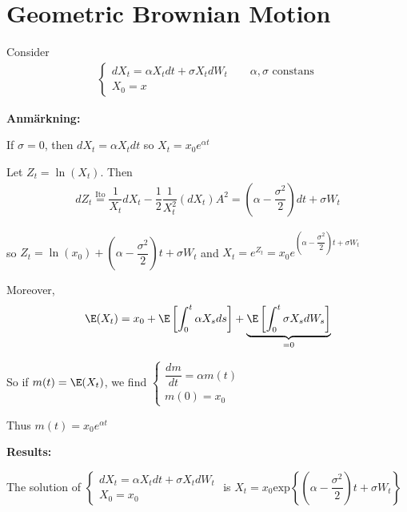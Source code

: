 \section{Geometric Brownian Motion}
Consider
\begin{equation*}
  \begin{gathered}
    \begin{cases}
      dX_t = \alpha X_tdt + \sigma X_tdW_t\qquad\text{$\alpha, \sigma$ constans}\\
      X_0 = x
    \end{cases}
  \end{gathered}
\end{equation*}\par
\noindent\textbf{Anmärkning:}\par
\noindent If $\sigma = 0$, then $dX_t = \alpha X_tdt$ so $X_t = x_0e^{\alpha t}$\par
\noindent Let $Z_t = \ln{\left(X_t\right)}$. Then
\begin{equation*}
  \begin{gathered}
    dZ_t \stackrel{\text{Ito}}{=}\dfrac{1}{X_t}dX_t - \dfrac{1}{2}\dfrac{1}{X_t^2}\left(dX_t\right)A^2 = \left(\alpha-\dfrac{\sigma^2}{2}\right)dt+\sigma W_t
  \end{gathered}
\end{equation*}\par
\noindent so $Z_t = \ln{\left(x_0\right)}+\left(\alpha-\dfrac{\sigma^2}{2}\right)t+\sigma W_t$ and $X_t = e^{Z_t}=x_0e^{\left(\alpha-\dfrac{\sigma^2}{2}\right)t+\sigma W_t}$
\par\bigskip
\noindent Moreover,
\begin{equation*}
  \begin{gathered}
    \E(X_t) = x_0+\E\left[\int_{0}^{t}\alpha X_sds\right] + \underbrace{\E\left[\int_{0}^{t}\sigma X_sdW_s\right]}_{=0}
  \end{gathered}
\end{equation*}\par
\noindent So if $m(t) = \E(X_t)$, we find $\begin{cases}
  \dfrac{dm}{dt} = \alpha m(t)\\ m(0)=x_0
\end{cases}$\par
\noindent Thus $m(t) = x_0e^{\alpha t}$
\par\bigskip
\noindent\textbf{Results:}\par
\noindent The solution of $\begin{cases}
  dX_t = \alpha X_tdt + \sigma X_tdW_t\\X_0=x_0
\end{cases}$ is $X_t = x_0\text{exp}\left\{\left(\alpha-\dfrac{\sigma^2}{2}\right)t+\sigma W_t\right\}$\par
